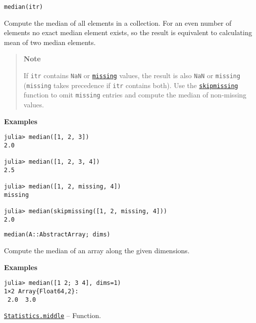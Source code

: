 \begin{adjustwidth}{2em}{0pt}


\begin{verbatim}
median(itr)
\end{verbatim}

Compute the median of all elements in a collection. For an even number of elements no exact median element exists, so the result is equivalent to calculating mean of two median elements.

\begin{quote}
\textbf{Note}

If \texttt{itr} contains \texttt{NaN} or \hyperlink{14596725676261444434}{\texttt{missing}} values, the result is also \texttt{NaN} or \texttt{missing} (\texttt{missing} takes precedence if \texttt{itr} contains both). Use the \hyperlink{2012470681884771400}{\texttt{skipmissing}} function to omit \texttt{missing} entries and compute the median of non-missing values.

\end{quote}
\textbf{Examples}


\begin{verbatim}
julia> median([1, 2, 3])
2.0

julia> median([1, 2, 3, 4])
2.5

julia> median([1, 2, missing, 4])
missing

julia> median(skipmissing([1, 2, missing, 4]))
2.0
\end{verbatim}




\begin{lstlisting}
median(A::AbstractArray; dims)
\end{lstlisting}

Compute the median of an array along the given dimensions.

\textbf{Examples}


\begin{verbatim}
julia> median([1 2; 3 4], dims=1)
1×2 Array{Float64,2}:
 2.0  3.0
\end{verbatim}



\end{adjustwidth}
\hypertarget{14662071173540942276}{} 
\hyperlink{14662071173540942276}{\texttt{Statistics.middle}}  -- {Function.}

